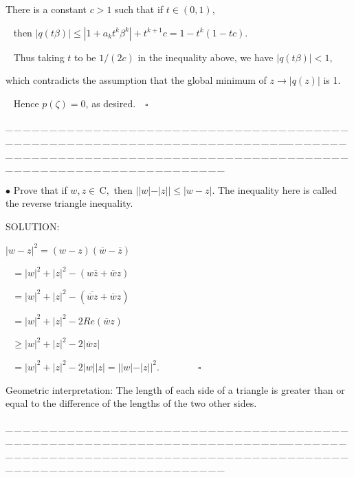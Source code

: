 \documentclass[a4paper, 11pt, UTF8]{article}
\def\Cbfc{$\,{\timesbf C}$}
\begin{document}
\begin{large}
There is a constant $c > 1$ such that if
$t\in (0, 1)$,\par\,\,\,
then $|q(t\beta)|\leq|1 + a_k t^k\beta^k|+t^{k+1}c = 1 - t^k (1 - tc)$.\par\,\,\,
Thus taking $t$ to be $1/(2c)$ in the inequality above, we have $|q(t\beta)| < 1$,\par\qquad\quad which contradicts the assumption that the global minimum of $z\rightarrow|q(z)|$ is 1.\par\,\,\,\large
Hence $p(\zeta) = 0$, as desired.$\quad\square$\par
{\tiny \_\,\_\,\_\,\_\,\_\,\_\,\_\,\_\,\_\,\_\,\_\,\_\,\_\,\_\,\_\,\_\,\_\,\_\,\_\,\_\,\_\,\_\,\_\,\_\,\_\,\_\,\_\,\_\,\_\,\_\,\_\,\_\,\_\,\_\,\_\,\_\,\_\,\_\,\_\,\_\,\_\,\_\,\_\,\_\,\_\,\_\,\_\,\_\,\_\,\_\,\_\,\_\,\_\,\_\,\_\,\_\,\_\,\_\,\_\,\_\,\_\,\_\,\_\,\_\,\_\,\_\,\_\,\_\,\_\,\_\,\_\_\,\_\,\_\,\_\,\_\,\_\,\_\,\_\,\_\,\_\,\_\,\_\,\_\,\_\,\_\,\_\,\_\,\_\,\_\,\_\,\_\,\_\,\_\,\_\,\_\,\_\,\_\,\_\,\_\,\_\,\_\,\_\,\_\,\_\,\_\,\_\,\_\,\_\,\_\,\_\,\_\,\_\,\_\,\_\,\_\,\_\,\_\,\_\,\_\,\_\,\_\,\_\,\_\,\_\,\_\,\_\,\_\,\_\,\_\,\_\,\_\,\_\,\_\,\_\,\_\,\_\,\_\,\_\,\_\,\_\,\_}\par

{\small $\bullet$} {\timessl\Large 
Prove that if $w, z\in\Cbfc,$ then $||w|-|z||\leq|w-z|$.
} {\timessl\small The inequality here is called the {\timesbf reverse triangle inequality}.
}\par
{\timesbf S\footnotesize{OLUTION:}}\par\quad
$|w-z|^2=(w-z)(\overline{w}-\overline{z})$\par\qquad\qquad\,\,
$=|w|^2+|z|^2-(w\overline{z}+\overline{w}z)$\par\qquad\qquad\,\,
$=|w|^2+|z|^2-(\overline{\overline{w}z}+\overline{w}z)$\par\qquad\qquad\,\,
$=|w|^2+|z|^2-2Re(\overline{w}z)$\par\qquad\qquad\,\,
$\geq |w|^2+|z|^2-2|\overline{w}z|$\par\qquad\qquad\,\,
$=|w|^2+|z|^2-2|w||z|=||w|-|z||^2.\qquad\qquad\square$
\par
{\timessl\footnotesize Geometric interpretation: The length of each side of a triangle is greater than or equal to the difference of the lengths of the two other sides.}\par
{\tiny \_\,\_\,\_\,\_\,\_\,\_\,\_\,\_\,\_\,\_\,\_\,\_\,\_\,\_\,\_\,\_\,\_\,\_\,\_\,\_\,\_\,\_\,\_\,\_\,\_\,\_\,\_\,\_\,\_\,\_\,\_\,\_\,\_\,\_\,\_\,\_\,\_\,\_\,\_\,\_\,\_\,\_\,\_\,\_\,\_\,\_\,\_\,\_\,\_\,\_\,\_\,\_\,\_\,\_\,\_\,\_\,\_\,\_\,\_\,\_\,\_\,\_\,\_\,\_\,\_\,\_\,\_\,\_\,\_\,\_\,\_\_\,\_\,\_\,\_\,\_\,\_\,\_\,\_\,\_\,\_\,\_\,\_\,\_\,\_\,\_\,\_\,\_\,\_\,\_\,\_\,\_\,\_\,\_\,\_\,\_\,\_\,\_\,\_\,\_\,\_\,\_\,\_\,\_\,\_\,\_\,\_\,\_\,\_\,\_\,\_\,\_\,\_\,\_\,\_\,\_\,\_\,\_\,\_\,\_\,\_\,\_\,\_\,\_\,\_\,\_\,\_\,\_\,\_\,\_\,\_\,\_\,\_\,\_\,\_\,\_\,\_\,\_\,\_\,\_\,\_\,\_}\par


\end{large}
\end{document}
